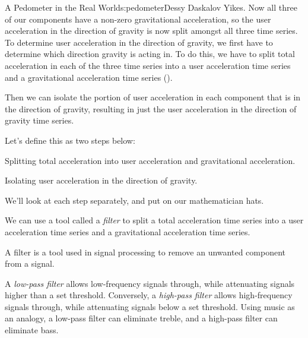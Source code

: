 \begin{aosachapter}{A Pedometer in the Real World}{s:pedometer}{Dessy Daskalov}
Yikes. Now all three of our components have a non-zero gravitational
acceleration, so the user acceleration in the direction of gravity is
now split amongst all three time series. To determine user acceleration
in the direction of gravity, we first have to determine which direction
gravity is acting in. To do this, we have to split total acceleration in
each of the three time series into a user acceleration time series and a
gravitational acceleration time series
().


Then we can isolate the portion of user acceleration in each component
that is in the direction of gravity, resulting in just the user
acceleration in the direction of gravity time series.

Let's define this as two steps below:

\begin{aosaenumerate}
\def\labelenumi{\arabic{enumi}.}

\item
  Splitting total acceleration into user acceleration and gravitational
  acceleration.
\item
  Isolating user acceleration in the direction of gravity.
\end{aosaenumerate}

We'll look at each step separately, and put on our mathematician hats.

\label{splitting-total-acceleration-into-user-acceleration-and-gravitational-acceleration}

We can use a tool called a \emph{filter} to split a total acceleration
time series into a user acceleration time series and a gravitational
acceleration time series.

\label{low-pass-and-high-pass-filters}

A filter is a tool used in signal processing to remove an unwanted
component from a signal.

A \emph{low-pass filter} allows low-frequency signals through, while
attenuating signals higher than a set threshold. Conversely, a
\emph{high-pass filter} allows high-frequency signals through, while
attenuating signals below a set threshold. Using music as an analogy, a
low-pass filter can eliminate treble, and a high-pass filter can
eliminate bass.


\end{aosachapter}
